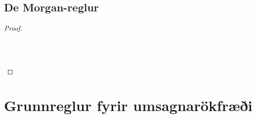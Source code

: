 \begin{multicols}{2}
\subsection*{De Morgan-reglur}
\begin{proof}

\\	

\\	

\\	
\end{proof}
\end{multicols}

\newpage

\section{Grunnreglur fyrir umsagnarökfræði}

